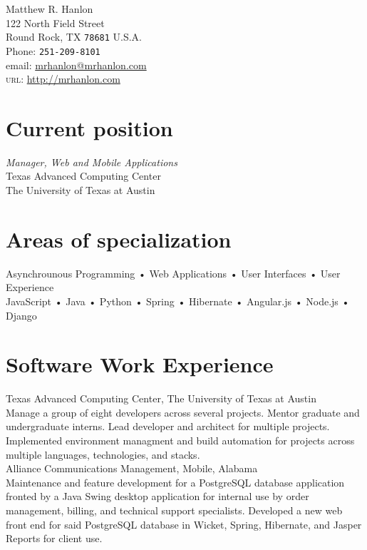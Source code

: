 \documentclass[10pt, a4paper]{article}
\newcommand{\years}[1]{\marginnote{\scriptsize #1}}
\begin{document}
{\LARGE Matthew R. Hanlon}\\[.5cm]
122 North Field Street\\
Round Rock, TX \texttt{78681}
U.S.A.\\[.1cm]
Phone: \texttt{251-209-8101}\\[.1cm]
email: \href{mailto:mrhanlon@mrhanlon.com}{mrhanlon@mrhanlon.com}\\
\textsc{url}: \href{http://mrhanlon.com}{http://mrhanlon.com}

\vfill{}

\section*{Current position}
\emph{Manager, Web and Mobile Applications}\\
Texas Advanced Computing Center\\
The University of Texas at Austin

\section*{Areas of specialization}
Asynchrounous Programming • Web Applications • User Interfaces • User Experience\\
JavaScript • Java • Python • Spring • Hibernate • Angular.js • Node.js • Django

\section*{Software Work Experience}
\noindent
\years{2010-present}Texas Advanced Computing Center, The University of Texas at Austin\\
{\small Manage a group of eight developers across several projects. Mentor graduate and undergraduate interns. Lead developer and architect for multiple projects. Implemented environment managment and build automation for projects across multiple languages, technologies, and stacks.}\\

\years{2007-2010}Alliance Communications Management, Mobile, Alabama\\
{\small Maintenance and feature development for a PostgreSQL database application fronted by a Java Swing desktop application for internal use by order management, billing, and technical support specialists. Developed a new web front end for said PostgreSQL database in Wicket, Spring, Hibernate, and Jasper Reports for client use.}
\end{document}
